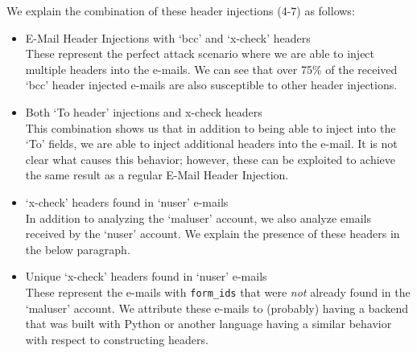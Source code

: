 
We explain the combination of these header injections (4-7) as follows:
\begin{itemize}
	\item E-Mail Header Injections with `bcc' and `x-check' headers\\
	These represent the perfect attack scenario where we are able to inject multiple headers into the e-mails. We can see that over 75\% of the received `bcc' header injected e-mails are also susceptible to other header injections.
	
	\item Both `To header' injections and x-check headers \\
	This combination shows us that in addition to being able to inject into the `To' fields, we are able to inject additional headers into the e-mail. It is not clear what causes this behavior; however, these can be exploited to achieve the same result as a regular E-Mail Header Injection.
	
	\item `x-check' headers found in `nuser' e-mails\\
	In addition to analyzing the `maluser' account, we also analyze emails received by the `nuser' account. We explain the presence of these headers in the below paragraph.

	\item Unique `x-check' headers found in `nuser' e-mails\\
	These represent the e-mails with \lstinline|form_ids| that were \emph{not} already found in the `maluser' account. We attribute these e-mails to (probably) having a backend that was built with Python or another language having a similar behavior with respect to constructing headers.
	
\end{itemize}
